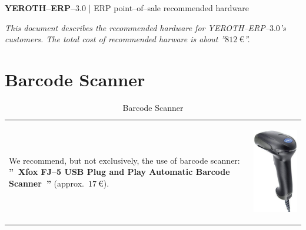 \documentclass[12pt, a4paper]{article}
\newcommand{\yerotherp}{\textcolor{yerenColorBlue}{\sc YEROTH--ERP--$3.0$}\xspace}
\newcommand{\chapintro}[1]{\textcolor{purplish}{\emph{#1}}\xspace}
\newcommand{\money}[1]{$#1\ \euro{}$\xspace}
\begin{document}
{\bf \LARGE \yerotherp} {| \sc \scriptsize ERP point--of--sale recommended hardware }

\vspace{2em}

\parbox{31em}{
\chapintro{
This document describes the recommended hardware for
\yerotherp's customers.
The total cost of recommended harware is 
about ''\money{812}''.\\}
}

\vspace{0em}

\section{Barcode Scanner}
\vspace{-3.7em}

\begin{table}[!htbp]
\begin{tabular}{lr}
\parbox{25em}{
We recommend, but not exclusively, the use 
of barcode scanner:
\textbf{''~Xfox FJ--5 USB Plug and Play Automatic
Barcode Scanner~''} (approx.~\money{17}).
\vspace{-3em}
}

&

\parbox{17em}{
\begin{center}
\includegraphics[scale=0.2]{images/xfox-fj-5-usb-plug-and-play-automatic-barcode-scanner.png}
\caption*{Barcode Scanner}
\end{center}
}
\end{tabular}
\end{table}
\end{document}
